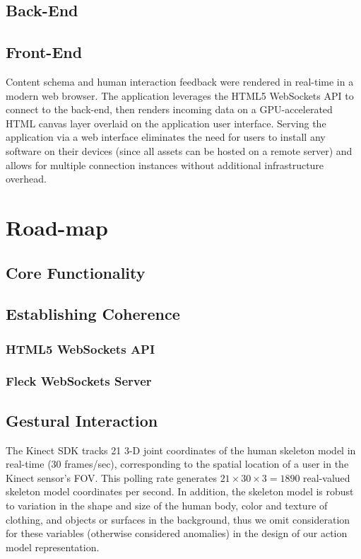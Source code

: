 \documentclass{scrartcl}
\begin{document}
    \subsection{Back-End}
    \subsection{Front-End}
      Content schema and human interaction feedback were rendered in real-time in a modern web browser. The application leverages the HTML5 WebSockets API to connect to the back-end, then renders incoming data on a GPU-accelerated HTML canvas layer overlaid on the application user interface. Serving the application via a web interface eliminates the need for users to install any software on their devices (since all assets can be hosted on a remote server) and allows for multiple connection instances without additional infrastructure overhead.

  \section{Road-map}
    \renewcommand{\thesubsection}{\Roman{subsection}}
    \subsection{Core Functionality\label{phase1}}
    \subsection{Establishing Coherence\label{phase2}}
      \subsubsection{HTML5 WebSockets API}
      \subsubsection{Fleck WebSockets Server}
    \subsection{Gestural Interaction\label{phase3}}
      The Kinect SDK tracks 21 3-D joint coordinates of the human skeleton model in real-time (30 frames/sec), corresponding to the spatial location of a user in the Kinect sensor's FOV. This polling rate generates $21 \times 30 \times 3 = 1890$ real-valued skeleton model coordinates per second. In addition, the skeleton model is robust to variation in the shape and size of the human body, color and texture of clothing, and objects or surfaces in the background, thus we omit consideration for these variables (otherwise considered anomalies) in the design of our action model representation.
\end{document}
